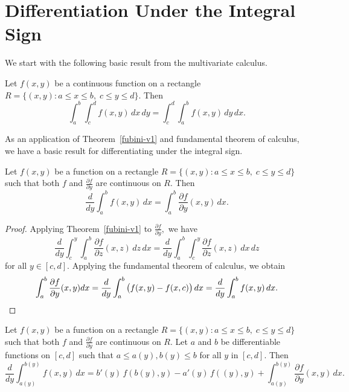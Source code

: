

\chapter{Differentiation Under the Integral Sign}\label{Leibnitz Rule-Improper Integrals}
We start with the following basic result from the multivariate calculus.

\begin{theorem}\label{fubini-v1}
	Let $f(x, y)$ be a continuous function on a rectangle $R=\{(x, y): a\le x \le b, \; c\le  y\le d\}.$ Then %
	\[\int_a^b \int_c^d  f(x, y)\, dx\, dy = \int_c^d \int_a^b f(x, y) \, dy\, dx.\]
\end{theorem}
As an application of Theorem~\ref{fubini-v1} and fundamental theorem of calculus, we have a basic result for differentiating under the integral sign.

\begin{theorem}\label{DUI-v1}
	Let $f(x, y)$ be a  function on a rectangle $R=\{(x, y): a\le x \le b, \; c\le  y\le d\}$ such that both $f$ and $\frac{\partial f}{\partial y}$ are continuous on $R.$ Then 
	\[\frac{d}{dy}\int_a^b  f(x, y)\, dx =  \int_a^b \frac{\partial f}{\partial y}(x, y) \,  dx.\]
\end{theorem}
\begin{proof}
Applying Theorem~\ref{fubini-v1} to $\frac{\partial f}{\partial y},$ we have
\[\frac{d}{dy}\int_c^y \int_a^b \frac{\partial f}{\partial z}(x, z) \, dz\, dx=\frac{d}{dy}\int_a^b \int_c^y  \frac{\partial f}{\partial z}(x, z)\, dx\, dz \]
for all $y\in [c, d].$  Applying the fundamental theorem of calculus, we obtain
\[\int_a^b \frac{\partial f}{\partial y}(x, y) dx =\frac{d}{dy}\int_a^b   \big(f(x, y) - f(x, c)\big)\, dx  =\frac{d}{dy}\int_a^b   f(x, y) \, dx. \qedhere\]
\end{proof}

\begin{theorem}\label{thm:DUI-v2}
	Let $f(x, y)$ be a  function on a rectangle $R=\{(x, y): a\le x \le b, \; c\le  y\le d\}$ such that both $f$ and $\frac{\partial f}{\partial y}$ are continuous on $R.$  Let $a$ and $b$ be differentiable functions on $[c, d]$ such that $a\le a(y), b(y) \le b$ for all $y$ in $[c, d].$
	Then 
	\[\frac{d}{dy}\int_{a(y)}^{b(y)}  f(x, y)\, dx =   b'(y)\, f(b(y), y) - a'(y) \,f((y), y)+\int_{a(y)}^{b(y)} \frac{\partial f}{\partial y}(x, y) \,  dx.\]
\end{theorem}

